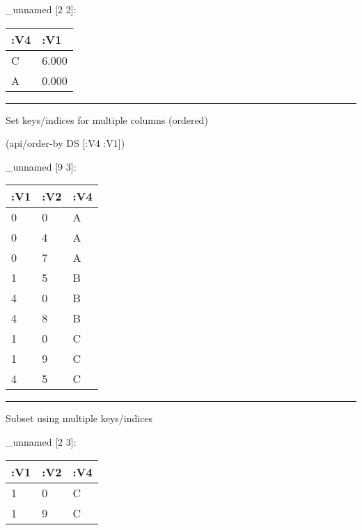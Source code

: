\documentclass[]{article}
\newenvironment{Shaded}{\begin{snugshade}}{\end{snugshade}}
\newcommand{\KeywordTok}[1]{\textcolor[rgb]{0.13,0.29,0.53}{\textbf{#1}}}
\newcommand{\DecValTok}[1]{\textcolor[rgb]{0.00,0.00,0.81}{#1}}
\newcommand{\StringTok}[1]{\textcolor[rgb]{0.31,0.60,0.02}{#1}}
\newcommand{\VariableTok}[1]{\textcolor[rgb]{0.00,0.00,0.00}{#1}}
\newcommand{\AttributeTok}[1]{\textcolor[rgb]{0.77,0.63,0.00}{#1}}
\newcommand{\NormalTok}[1]{#1}
\begin{document}
\_unnamed {[}2 2{]}:

\begin{longtable}[]{@{}ll@{}}
\toprule
:V4 & :V1\tabularnewline
\midrule
\endhead
C & 6.000\tabularnewline
A & 0.000\tabularnewline
\bottomrule
\end{longtable}

\begin{center}\rule{0.5\linewidth}{0.5pt}\end{center}

Set keys/indices for multiple columns (ordered)

\begin{Shaded}
\begin{Highlighting}[]
\NormalTok{(api/order-by DS [}\AttributeTok{:V4} \AttributeTok{:V1}\NormalTok{])}
\end{Highlighting}
\end{Shaded}

\_unnamed {[}9 3{]}:

\begin{longtable}[]{@{}lll@{}}
\toprule
:V1 & :V2 & :V4\tabularnewline
\midrule
\endhead
0 & 0 & A\tabularnewline
0 & 4 & A\tabularnewline
0 & 7 & A\tabularnewline
1 & 5 & B\tabularnewline
4 & 0 & B\tabularnewline
4 & 8 & B\tabularnewline
1 & 0 & C\tabularnewline
1 & 9 & C\tabularnewline
4 & 5 & C\tabularnewline
\bottomrule
\end{longtable}

\begin{center}\rule{0.5\linewidth}{0.5pt}\end{center}

Subset using multiple keys/indices

\begin{Shaded}
\end{Shaded}

\_unnamed {[}2 3{]}:

\begin{longtable}[]{@{}lll@{}}
\toprule
:V1 & :V2 & :V4\tabularnewline
\midrule
\endhead
1 & 0 & C\tabularnewline
1 & 9 & C\tabularnewline
\bottomrule
\end{longtable}
\end{document}
